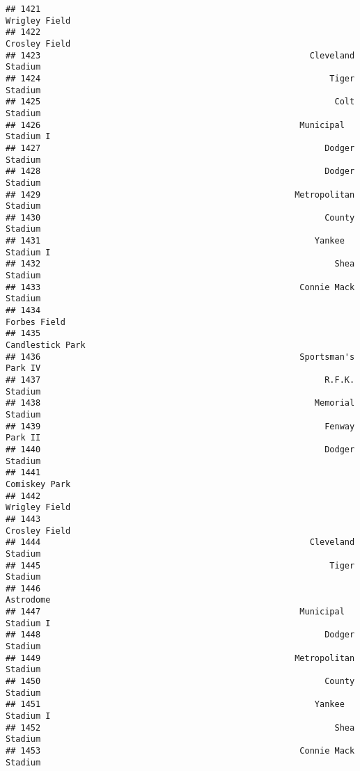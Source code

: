 \documentclass[]{article}
\begin{document}
\begin{verbatim}
## 1421                                                          Wrigley Field
## 1422                                                          Crosley Field
## 1423                                                      Cleveland Stadium
## 1424                                                          Tiger Stadium
## 1425                                                           Colt Stadium
## 1426                                                    Municipal Stadium I
## 1427                                                         Dodger Stadium
## 1428                                                         Dodger Stadium
## 1429                                                   Metropolitan Stadium
## 1430                                                         County Stadium
## 1431                                                       Yankee Stadium I
## 1432                                                           Shea Stadium
## 1433                                                    Connie Mack Stadium
## 1434                                                           Forbes Field
## 1435                                                       Candlestick Park
## 1436                                                    Sportsman's Park IV
## 1437                                                         R.F.K. Stadium
## 1438                                                       Memorial Stadium
## 1439                                                         Fenway Park II
## 1440                                                         Dodger Stadium
## 1441                                                          Comiskey Park
## 1442                                                          Wrigley Field
## 1443                                                          Crosley Field
## 1444                                                      Cleveland Stadium
## 1445                                                          Tiger Stadium
## 1446                                                              Astrodome
## 1447                                                    Municipal Stadium I
## 1448                                                         Dodger Stadium
## 1449                                                   Metropolitan Stadium
## 1450                                                         County Stadium
## 1451                                                       Yankee Stadium I
## 1452                                                           Shea Stadium
## 1453                                                    Connie Mack Stadium

\end{verbatim}
\end{document}
